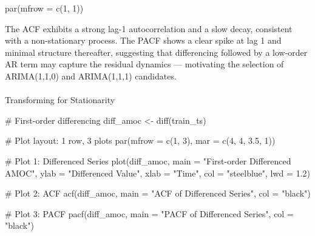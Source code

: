 \documentclass[
  11pt,
]{article}
\makeatletter
\let\oldparagraph\paragraph
\renewcommand{\paragraph}{
    \@ifstar
      \xxxParagraphStar
      \xxxParagraphNoStar
  }
\newcommand{\xxxParagraphStar}[1]{\oldparagraph*{#1}\mbox{}}
\newcommand{\xxxParagraphNoStar}[1]{\oldparagraph{#1}\mbox{}}
\newenvironment{Shaded}{\begin{snugshade}}{\end{snugshade}}
\newcommand{\AttributeTok}[1]{\textcolor[rgb]{0.40,0.45,0.13}{#1}}
\newcommand{\CommentTok}[1]{\textcolor[rgb]{0.37,0.37,0.37}{#1}}
\newcommand{\DecValTok}[1]{\textcolor[rgb]{0.68,0.00,0.00}{#1}}
\newcommand{\FloatTok}[1]{\textcolor[rgb]{0.68,0.00,0.00}{#1}}
\newcommand{\FunctionTok}[1]{\textcolor[rgb]{0.28,0.35,0.67}{#1}}
\newcommand{\NormalTok}[1]{\textcolor[rgb]{0.00,0.23,0.31}{#1}}
\newcommand{\OtherTok}[1]{\textcolor[rgb]{0.00,0.23,0.31}{#1}}
\newcommand{\StringTok}[1]{\textcolor[rgb]{0.13,0.47,0.30}{#1}}
\makeatother
\begin{document}
\begin{Shaded}
\begin{Highlighting}[]
\FunctionTok{par}\NormalTok{(}\AttributeTok{mfrow =} \FunctionTok{c}\NormalTok{(}\DecValTok{1}\NormalTok{, }\DecValTok{1}\NormalTok{))}
\end{Highlighting}
\end{Shaded}

The ACF exhibits a strong lag-1 autocorrelation and a slow decay,
consistent with a non-stationary process. The PACF shows a clear spike
at lag 1 and minimal structure thereafter, suggesting that differencing
followed by a low-order AR term may capture the residual dynamics ---
motivating the selection of ARIMA(1,1,0) and ARIMA(1,1,1) candidates.

\paragraph{Transforming for
Stationarity}\label{transforming-for-stationarity}

\begin{Shaded}
\begin{Highlighting}[]
\CommentTok{\# First{-}order differencing}
\NormalTok{diff\_amoc }\OtherTok{\textless{}{-}} \FunctionTok{diff}\NormalTok{(train\_ts)}

\CommentTok{\# Plot layout: 1 row, 3 plots}
\FunctionTok{par}\NormalTok{(}\AttributeTok{mfrow =} \FunctionTok{c}\NormalTok{(}\DecValTok{1}\NormalTok{, }\DecValTok{3}\NormalTok{), }\AttributeTok{mar =} \FunctionTok{c}\NormalTok{(}\DecValTok{4}\NormalTok{, }\DecValTok{4}\NormalTok{, }\FloatTok{3.5}\NormalTok{, }\DecValTok{1}\NormalTok{))}

\CommentTok{\# Plot 1: Differenced Series}
\FunctionTok{plot}\NormalTok{(diff\_amoc, }
     \AttributeTok{main =} \StringTok{"First{-}order Differenced AMOC"}\NormalTok{, }
     \AttributeTok{ylab =} \StringTok{"Differenced Value"}\NormalTok{, }
     \AttributeTok{xlab =} \StringTok{"Time"}\NormalTok{, }
     \AttributeTok{col =} \StringTok{"steelblue"}\NormalTok{, }
     \AttributeTok{lwd =} \FloatTok{1.2}\NormalTok{)}

\CommentTok{\# Plot 2: ACF}
\FunctionTok{acf}\NormalTok{(diff\_amoc, }
    \AttributeTok{main =} \StringTok{"ACF of Differenced Series"}\NormalTok{, }
    \AttributeTok{col =} \StringTok{"black"}\NormalTok{)}

\CommentTok{\# Plot 3: PACF}
\FunctionTok{pacf}\NormalTok{(diff\_amoc, }
     \AttributeTok{main =} \StringTok{"PACF of Differenced Series"}\NormalTok{, }
     \AttributeTok{col =} \StringTok{"black"}\NormalTok{)}
\end{Highlighting}
\end{Shaded}
\end{document}
